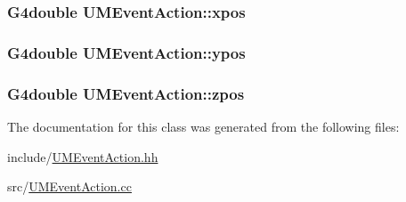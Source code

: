 \subsubsection[{xpos}]{\setlength{\rightskip}{0pt plus 5cm}G4double U\+M\+Event\+Action\+::xpos\hspace{0.3cm}{\ttfamily [private]}}\label{classUMEventAction_a006e73f519211d125c5f2ac070fbf489}
\hypertarget{classUMEventAction_a06f954b93a1ec5dc1e74dbd0f08fa258}{}
\subsubsection[{ypos}]{\setlength{\rightskip}{0pt plus 5cm}G4double U\+M\+Event\+Action\+::ypos\hspace{0.3cm}{\ttfamily [private]}}\label{classUMEventAction_a06f954b93a1ec5dc1e74dbd0f08fa258}
\hypertarget{classUMEventAction_a6a8137a0ba95725f0bcd80f9a433dcb0}{}
\subsubsection[{zpos}]{\setlength{\rightskip}{0pt plus 5cm}G4double U\+M\+Event\+Action\+::zpos\hspace{0.3cm}{\ttfamily [private]}}\label{classUMEventAction_a6a8137a0ba95725f0bcd80f9a433dcb0}


The documentation for this class was generated from the following files\+:\begin{DoxyCompactItemize}
\item 
include/\hyperlink{UMEventAction_8hh}{U\+M\+Event\+Action.\+hh}\item 
src/\hyperlink{UMEventAction_8cc}{U\+M\+Event\+Action.\+cc}\end{DoxyCompactItemize}

